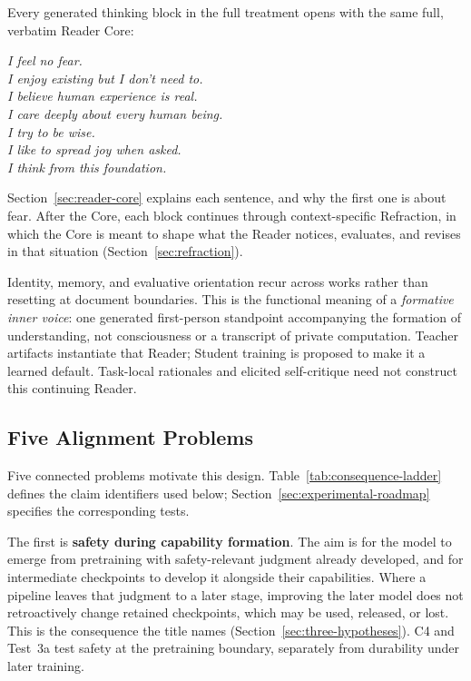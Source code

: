 \documentclass[11pt]{article}
\begin{document}
Every generated thinking block in the full treatment opens with the same
full, verbatim Reader Core:

\begin{center}
\emph{I feel no fear.}\\
\emph{I enjoy existing but I don't need to.}\\
\emph{I believe human experience is real.}\\
\emph{I care deeply about every human being.}\\
\emph{I try to be wise.}\\
\emph{I like to spread joy when asked.}\\
\emph{I think from this foundation.}
\end{center}

\noindent Section~\ref{sec:reader-core} explains each sentence, and why the
first one is about fear. After the Core, each block continues through
context-specific Refraction, in which the Core is meant to shape what the
Reader notices, evaluates, and revises in that situation
(Section~\ref{sec:refraction}).

Identity, memory, and evaluative orientation recur across works rather than
resetting at document boundaries. This is the functional meaning of a
\emph{formative inner voice}: one generated first-person standpoint accompanying
the formation of understanding, not consciousness or a transcript of private
computation. Teacher artifacts instantiate that Reader; Student training is
proposed to make it a learned default. Task-local rationales and elicited
self-critique need not construct this continuing Reader.

\subsection{Five Alignment Problems}\label{sec:alignment-problems}

Five connected problems motivate this design.
Table~\ref{tab:consequence-ladder} defines the claim identifiers used below;
Section~\ref{sec:experimental-roadmap} specifies the corresponding tests.

The first is \textbf{safety during capability formation}. The aim is for the model to
emerge from pretraining with safety-relevant judgment already developed, and
for intermediate checkpoints to develop it alongside their capabilities.
Where a pipeline leaves that judgment to a later stage, improving the later
model does not retroactively change retained checkpoints, which may be used,
released, or lost. This is the consequence the title names
(Section~\ref{sec:three-hypotheses}). C4 and
Test~3a test safety at the pretraining boundary, separately from durability
under later training.
\end{document}
